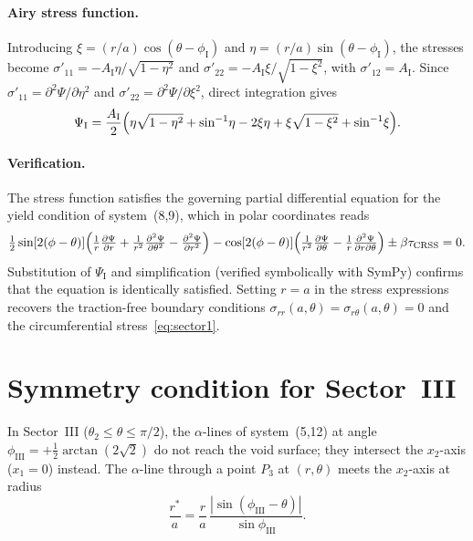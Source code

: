 \documentclass{svjour3} %
\newcommand{\tcrss}{\tau_{\mathrm{CRSS}}}
\newcommand{\srr}{\sigma_{rr}}
\newcommand{\srt}{\sigma_{r\theta}}
\begin{document}
\begin{appendices}
\paragraph{Airy stress function.}
Introducing $\xi = (r/a)\cos(\theta - \phi_{\mathrm{I}})$ and
$\eta = (r/a)\sin(\theta - \phi_{\mathrm{I}})$, the stresses become
$\sigma'_{11} = -A_{\mathrm{I}}\eta/\sqrt{1-\eta^2}$ and
$\sigma'_{22} = -A_{\mathrm{I}}\xi/\sqrt{1-\xi^2}$, with
$\sigma'_{12} = A_{\mathrm{I}}$. Since
$\sigma'_{11} = \partial^2\Psi/\partial\eta^2$ and
$\sigma'_{22} = \partial^2\Psi/\partial\xi^2$, direct integration gives
\begin{equation}
\Psi_{\mathrm{I}} = \frac{A_{\mathrm{I}}}{2}
  \Bigl(\eta\sqrt{1-\eta^2} + \sin^{-1}\!\eta
  - 2\xi\eta + \xi\sqrt{1-\xi^2} + \sin^{-1}\!\xi\Bigr).
\end{equation}

\paragraph{Verification.}
The stress function satisfies the governing partial differential
equation for the yield condition of system~(8,9), which in polar
coordinates reads~\citep[Eq.~(7)]{kysar2005}
\begin{equation}
\tfrac{1}{2}\sin[2(\phi - \theta)]
  \Bigl(\tfrac{1}{r}\tfrac{\partial\Psi}{\partial r}
  + \tfrac{1}{r^2}\tfrac{\partial^2\Psi}{\partial\theta^2}
  - \tfrac{\partial^2\Psi}{\partial r^2}\Bigr)
  - \cos[2(\phi - \theta)]
  \Bigl(\tfrac{1}{r^2}\tfrac{\partial\Psi}{\partial\theta}
  - \tfrac{1}{r}\tfrac{\partial^2\Psi}{\partial r\partial\theta}\Bigr)
  \pm \beta\tcrss = 0.
\end{equation}
Substitution of $\Psi_{\mathrm{I}}$ and simplification (verified
symbolically with SymPy) confirms that the equation is identically
satisfied. Setting $r = a$ in the stress expressions recovers the
traction-free boundary conditions $\srr(a, \theta) = \srt(a, \theta) = 0$
and the circumferential stress~\eqref{eq:sector1}.

\section{Symmetry condition for Sector~III}
\label{app:sector_III}

In Sector~III ($\theta_2 \leq \theta \leq \pi/2$), the $\alpha$-lines
of system~(5,12) at angle $\phi_{\mathrm{III}} = +\frac{1}{2}\arctan(2\sqrt{2})$
do not reach the void surface; they intersect the $x_2$-axis
($x_1 = 0$) instead. The $\alpha$-line through a point $P_3$ at
$(r, \theta)$ meets the $x_2$-axis at radius
\begin{equation}
\label{eq:app_rstar}
\frac{r^*}{a} = \frac{r}{a}\,
  \frac{|\sin(\phi_{\mathrm{III}} - \theta)|}{\sin\phi_{\mathrm{III}}}.
\end{equation}


\end{appendices}
\end{document}
